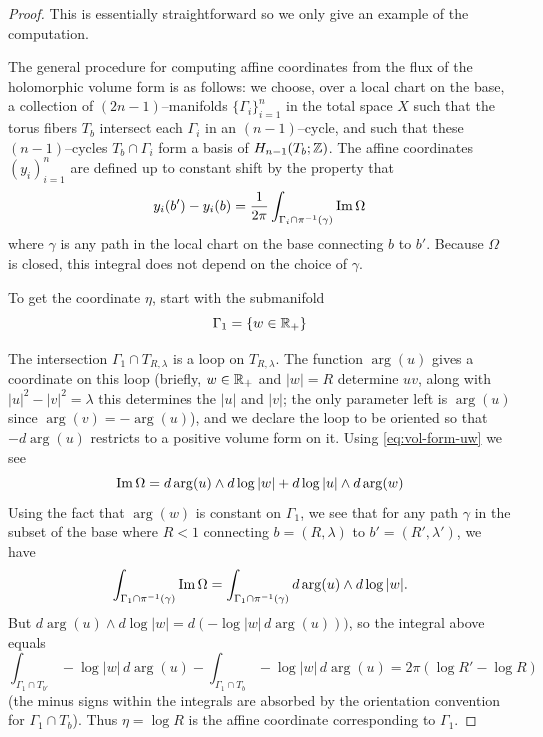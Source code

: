 \documentclass[12pt]{amsart}
\begin{document}
\begin{proof}
  This is essentially straightforward so we only give an example of
  the computation.

  The general procedure for computing affine coordinates from the flux
  of the holomorphic volume form is as follows: we choose, over a
  local chart on the base, a collection of $(2n-1)$--manifolds
  $\{\Gamma_i\}_{i=1}^n$ in the total space $X$ such that the torus
  fibers $T_b$ intersect each $\Gamma_i$ in an $(n-1)$--cycle, and
  such that these $(n-1)$--cycles $T_b \cap \Gamma_i$ form a basis of
  $H_{n-1}(T_b;\mathbb{Z})$. The affine coordinates $(y_i)_{i=1}^n$ are
  defined up to constant shift by the property that
  \begin{equation}
    y_i(b')-y_i(b) = \frac{1}{2\pi}\int_{\Gamma_i \cap \pi^{-1}(\gamma)} \operatorname{Im} \Omega
  \end{equation}
  where $\gamma$ is any path in the local chart on the base connecting
  $b$ to $b'$. Because $\Omega$ is closed, this integral does not
  depend on the choice of $\gamma$.

  To get the coordinate $\eta$, start with the submanifold
  \begin{equation}
    \Gamma_1= \{w \in \mathbb{R}_+\}
  \end{equation}

  
  The intersection $\Gamma_1 \cap T_{R,\lambda}$ is a loop on
  $T_{R,\lambda}$. The function $\arg(u)$ gives a coordinate on this
  loop (briefly, $w\in \mathbb{R}_+$ and $|w| = R$ determine $uv$, along with
  $|u|^2 - |v|^2 = \lambda$ this determines the $|u|$ and $|v|$; the
  only parameter left is $\arg(u)$ since $\arg(v) = - \arg(u)$), and
  we declare the loop to be oriented so that $-d\arg(u)$ restricts to
  a positive volume form on it. Using \eqref{eq:vol-form-uw} we see
  \begin{equation}
    \label{eq:im-vol-form-uw}
    \operatorname{Im} \Omega = d\arg(u) \wedge d\log|w| + d\log|u| \wedge d\arg(w) 
  \end{equation}
  Using the fact that $\arg(w)$ is constant on $\Gamma_1$, we see
  that for any path $\gamma$ in the subset of the base where $R < 1$
  connecting $b = (R,\lambda)$ to $b'=(R',\lambda')$, we have 
  \begin{equation}
    \int_{\Gamma_1\cap \pi^{-1}(\gamma)} \operatorname{Im} \Omega =
    \int_{\Gamma_1\cap \pi^{-1}(\gamma)} d\arg(u) \wedge d\log|w|.
  \end{equation}
  But $d\arg(u) \wedge d\log|w| = d(-\log|w|\,d\arg(u)))$, so
  the integral above equals
  \begin{equation}
    \int_{\Gamma_1 \cap T_{b'}} -\log|w|\,d\arg(u) -
    \int_{\Gamma_1\cap T_b} -\log|w|\,d\arg(u) = 2\pi(\log R' - \log R)
  \end{equation}
  (the minus signs within the integrals are absorbed by the
  orientation convention for $\Gamma_1 \cap T_b$). Thus $\eta = \log
  R$ is the affine coordinate corresponding to $\Gamma_1$.


\end{proof}
\end{document}
